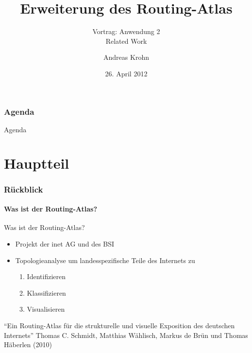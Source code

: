 \documentclass[ngerman,compress,hyperref={bookmarks}]{beamer}
\title{Erweiterung des Routing-Atlas}
\subtitle{Vortrag: Anwendung 2\\ Related Work}
\author{Andreas Krohn}
\institute[HAW]{Hochschule für Angewandte Wissenschaften Hamburg}
\date[SoSe 2012]{26. April 2012}
\begin{document}
\frame[plain]{\titlepage}

\section*{Agenda}
\begin{frame}{Agenda} \setcounter{tocdepth}{1} \tableofcontents[part=1] \setcounter{tocdepth}{3} \end{frame}

\part{Hauptteil}
\section{Rückblick}

\subsection{Was ist der Routing-Atlas?}
\begin{frame}{Was ist der Routing-Atlas?}
  \begin{itemize}
    \item Projekt der inet AG und des BSI
    \item Topologieanalyse um landesspezifische Teile des Internets zu
    \begin{enumerate}
      \item Identifizieren
      \item Klassifizieren
      \item Visualisieren
    \end{enumerate}
  \end{itemize}
  \vspace{1cm}
  \begin{thebibliography}{}
     ``Ein Routing-Atlas für die strukturelle und visuelle Exposition des deutschen Internets''
    \newblock Thomas C. Schmidt, Matthias Wählisch, Markus de Brün und Thomas Häberlen (2010)\\[-20pt]
  \end{thebibliography}
\end{frame}
\end{document}
